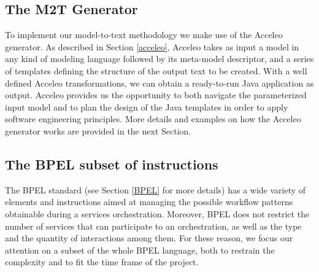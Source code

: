 \subsection{The M2T Generator}
\label{Sec:M2TGenerator}
To implement our model-to-text methodology we make use of the Acceleo generator. As described in Section \ref{acceleo}, Acceleo takes as input a model in any kind of modeling language followed by its meta-model descriptor, and a series of templates defining the structure of the output text to be created.
With a well defined Acceleo transformations, we can obtain a ready-to-run Java application as output.
Acceleo provides us the opportunity to both navigate the parameterized input model and to plan the design of the Java templates in order to apply software engineering principles. More details and examples on how the Acceleo generator works are provided in the next Section.
\subsection{The BPEL subset of instructions}
\label{Sec:BPELsubset}
The BPEL standard (see Section \ref{BPEL} for more details) has a wide variety of elements and instructions aimed at managing the possible workflow patterns obtainable during a services orchestration. Moreover, BPEL does not restrict the number of services that can participate to an orchestration, as well as the type and the quantity of interactions among them.
For these reason, we focus our attention on a subset of the whole BPEL language, both to restrain the complexity and to fit the time frame of the project.
